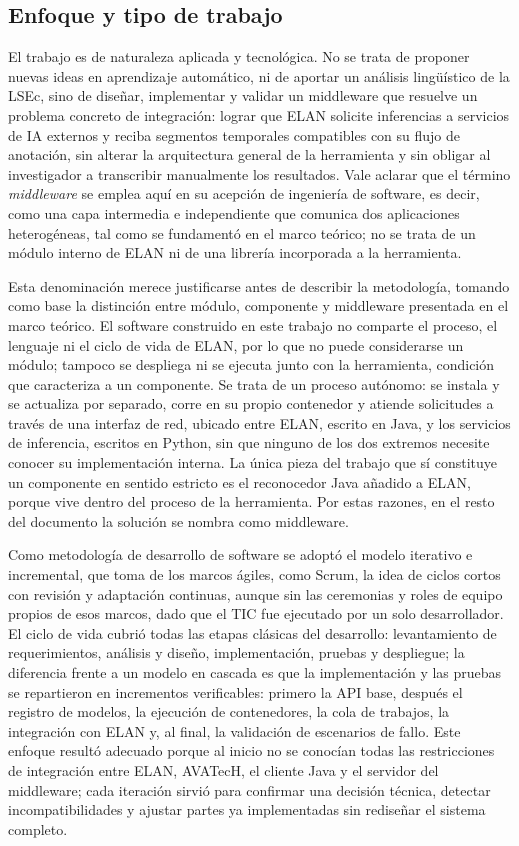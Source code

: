 \documentclass[11pt,a4paper]{article}
\begin{document}
\subsection{Enfoque y tipo de trabajo}

El trabajo es de naturaleza aplicada y tecnológica. No se trata de proponer nuevas ideas en aprendizaje automático, ni de aportar un análisis lingüístico de la LSEc, sino de diseñar, implementar y validar un middleware que resuelve un problema concreto de integración: lograr que ELAN solicite inferencias a servicios de IA externos y reciba segmentos temporales compatibles con su flujo de anotación, sin alterar la arquitectura general de la herramienta y sin obligar al investigador a transcribir manualmente los resultados. Vale aclarar que el término \textit{middleware} se emplea aquí en su acepción de ingeniería de software, es decir, como una capa intermedia e independiente que comunica dos aplicaciones heterogéneas, tal como se fundamentó en el marco teórico; no se trata de un módulo interno de ELAN ni de una librería incorporada a la herramienta.

Esta denominación merece justificarse antes de describir la metodología, tomando como base la distinción entre módulo, componente y middleware presentada en el marco teórico. El software construido en este trabajo no comparte el proceso, el lenguaje ni el ciclo de vida de ELAN, por lo que no puede considerarse un módulo; tampoco se despliega ni se ejecuta junto con la herramienta, condición que caracteriza a un componente. Se trata de un proceso autónomo: se instala y se actualiza por separado, corre en su propio contenedor y atiende solicitudes a través de una interfaz de red, ubicado entre ELAN, escrito en Java, y los servicios de inferencia, escritos en Python, sin que ninguno de los dos extremos necesite conocer su implementación interna. La única pieza del trabajo que sí constituye un componente en sentido estricto es el reconocedor Java añadido a ELAN, porque vive dentro del proceso de la herramienta. Por estas razones, en el resto del documento la solución se nombra como middleware.

Como metodología de desarrollo de software se adoptó el modelo iterativo e incremental, que toma de los marcos ágiles, como Scrum, la idea de ciclos cortos con revisión y adaptación continuas, aunque sin las ceremonias y roles de equipo propios de esos marcos, dado que el TIC fue ejecutado por un solo desarrollador. El ciclo de vida cubrió todas las etapas clásicas del desarrollo: levantamiento de requerimientos, análisis y diseño, implementación, pruebas y despliegue; la diferencia frente a un modelo en cascada es que la implementación y las pruebas se repartieron en incrementos verificables: primero la API base, después el registro de modelos, la ejecución de contenedores, la cola de trabajos, la integración con ELAN y, al final, la validación de escenarios de fallo. Este enfoque resultó adecuado porque al inicio no se conocían todas las restricciones de integración entre ELAN, AVATecH, el cliente Java y el servidor del middleware; cada iteración sirvió para confirmar una decisión técnica, detectar incompatibilidades y ajustar partes ya implementadas sin rediseñar el sistema completo.
\end{document}
